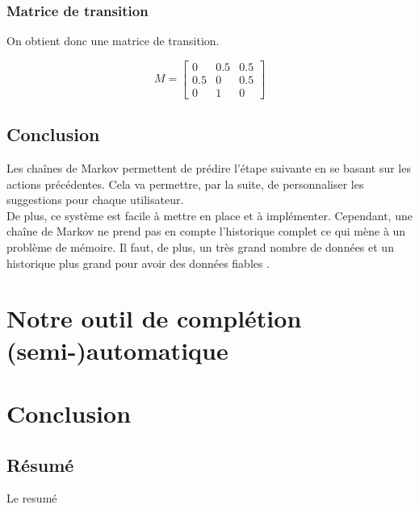\documentclass[a4paper, 11pt]{report}
\begin{document}
\subsection*{Matrice de transition}
On obtient donc une matrice de transition. 

\[
M =
\begin{bmatrix}
0 & 0.5 & 0.5 \\
0.5 & 0 & 0.5 \\
0 & 1 & 0
\end{bmatrix}
\]



\section{Conclusion}

Les chaînes de Markov permettent de prédire l'étape suivante en se basant sur les actions précédentes. Cela va permettre, par la suite, de personnaliser les suggestions pour chaque utilisateur. \\
De plus, ce système est facile à mettre en place et à implémenter. Cependant, une chaîne de Markov ne prend pas en compte l'historique complet ce qui mène à un problème de mémoire. Il faut, de plus, un très grand nombre de données et un historique plus grand pour avoir des données fiables .
\chapter{Notre outil de complétion (semi-)automatique}

\chapter*{Conclusion}
\newpage
\begin{center}
    \vspace*{\fill} %
    \section*{Résumé}
    \begin{justify}
Le resumé


    \end{justify}
\end{center}
\end{document}
